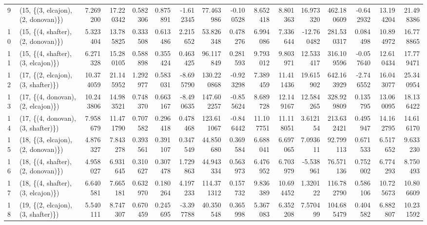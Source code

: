 \begin{tabular}{llrrrrrrrrrrrrrr}
9  &  (15, \{(3, elcajon), (2, donovan)\}) &   7.269200 &  17.220342 &   0.582306 &  0.875891 &  -1.612345 &   77.463986 & -0.100528 &   8.652418 &   8.801363 &  16.973320 &  462.180609 & -0.642932 &  13.194204 &  21.498386 \\
10 &  (15, \{(4, shafter), (2, donovan)\}) &   5.323404 &  13.785825 &   0.333508 &  0.613486 &   2.215652 &   53.826348 &  0.478276 &   6.994086 &   7.336644 & -12.760482 &  281.530317 &  0.084498 &  10.894972 &  16.778865 \\
11 &  (15, \{(4, shafter), (3, elcajon)\}) &   6.271328 &  15.280105 &   0.588898 &  0.355424 &   0.463425 &   96.117849 &  0.281593 &   9.793012 &   9.803971 &  12.533417 &  316.109596 & -0.057640 &  12.610434 &  17.779471 \\
12 &  (17, \{(2, elcajon), (3, shafter)\}) &  10.374059 &  21.145952 &   1.292977 &  0.583031 &  -8.695790 &  130.220868 & -0.923298 &   7.389459 &  11.411436 &  19.615902 &  642.163929 & -2.746552 &  16.043077 &  25.340954 \\
13 &  (17, \{(4, donovan), (2, elcajon)\}) &  10.243806 &  14.983521 &   0.748370 &  0.663167 &  -8.490635 &  147.602257 & -0.855624 &   8.689728 &  12.149167 &  12.584265 &  328.929809 &  0.135795 &  13.060095 &  18.136422 \\
14 &  (17, \{(4, donovan), (3, shafter)\}) &   7.958679 &  11.471790 &   0.707582 &  0.296418 &   0.478468 &  123.611067 & -0.846442 &  11.107751 &  11.118051 &   3.612154 &  213.632421 &  0.495947 &  14.162795 &  14.616170 \\
15 &  (18, \{(3, elcajon), (2, donovan)\}) &   4.876327 &   7.843278 &   0.393561 &  0.391107 &   0.347549 &   44.850680 &  0.369584 &   6.688041 &   6.697065 &   7.093611 &   92.799113 &  0.671533 &   6.517652 &   9.633230 \\
16 &  (18, \{(4, shafter), (2, donovan)\}) &   4.958027 &   6.931645 &   0.310627 &  0.307478 &   1.729863 &   44.943334 &  0.563973 &   6.476952 &   6.703979 &  -5.538961 &   76.571136 &  0.752002 &   6.774293 &   8.750493 \\
17 &  (18, \{(4, shafter), (3, elcajon)\}) &   6.640581 &   7.665181 &   0.632970 &  0.180264 &   4.197233 &  114.371312 &  0.157732 &   9.836389 &  10.694452 &   1.320122 &  116.782790 &  0.586106 &  10.725673 &  10.806609 \\
18 &  (19, \{(2, elcajon), (3, shafter)\}) &   5.540111 &   8.747307 &   0.670459 &  0.245695 &  -3.397788 &   40.350548 &  0.365998 &   5.367083 &   6.352208 &   7.570499 &  104.685479 &  0.404582 &   6.882807 &  10.231592 \\

\end{tabular}
